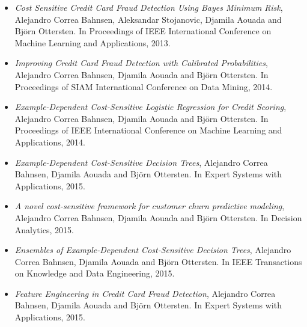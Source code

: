 \begin{itemize}
\item \citep{CorreaBahnsen2013} \textit{Cost Sensitive Credit Card Fraud Detection Using Bayes 
Minimum Risk}, Alejandro Correa Bahnsen,  Aleksandar Stojanovic, Djamila Aouada and Bj\"orn 
Ottersten. In Proceedings of IEEE International Conference on Machine Learning and Applications, 
2013.

\item \citep{CorreaBahnsen2014} \textit{Improving Credit Card Fraud Detection with Calibrated 
Probabilities}, Alejandro Correa Bahnsen, Djamila Aouada and Bj\"orn Ottersten.
In Proceedings of SIAM International Conference on Data Mining, 2014.

\item \citep{CorreaBahnsen2014b} \textit{Example-Dependent Cost-Sensitive Logistic Regression for 
Credit Scoring}, Alejandro Correa Bahnsen, Djamila Aouada and Bj\"orn Ottersten.
In Proceedings of IEEE International Conference on Machine Learning and Applications, 2014.

\item \citep{CorreaBahnsen2015} \textit{Example-Dependent Cost-Sensitive Decision Trees},
Alejandro Correa Bahnsen, Djamila Aouada and Bj\"orn Ottersten.
In Expert Systems with Applications, 2015.

\item \citep{CorreaBahnsen2015a} \textit{A novel cost-sensitive framework for customer churn 
predictive modeling}, Alejandro Correa Bahnsen, Djamila Aouada and Bj\"orn Ottersten.
In Decision Analytics, 2015.

\item \citep{CorreaBahnsen2015b} \textit{Ensembles of Example-Dependent Cost-Sensitive Decision 
Trees}, Alejandro Correa Bahnsen, Djamila Aouada and Bj\"orn Ottersten.
In IEEE Transactions on Knowledge and Data Engineering, 2015.

\item \citep{CorreaBahnsen2015c} \textit{Feature Engineering in Credit Card Fraud Detection},
Alejandro Correa Bahnsen, Djamila Aouada and Bj\"orn Ottersten. In Expert Systems with 
Applications, 2015.

\end{itemize}
